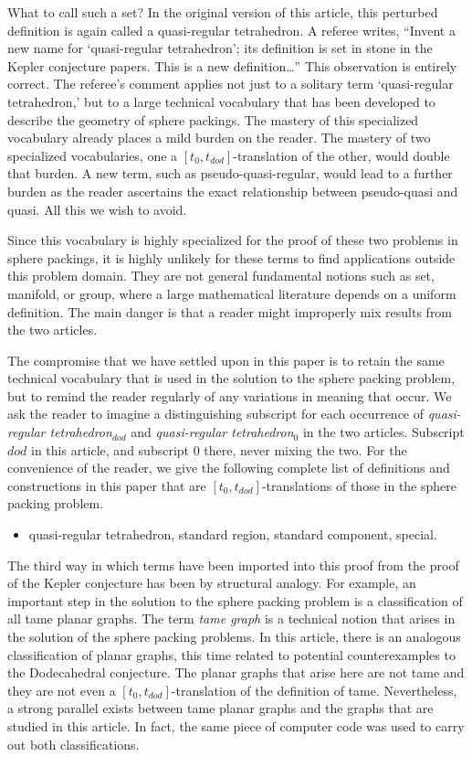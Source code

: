 What to call such a set?  In the original version of this article,
this perturbed definition is again called a quasi-regular tetrahedron. 
A referee writes, ``Invent a new name
for `quasi-regular tetrahedron'; its definition is set in stone
in the Kepler conjecture papers.  This is a new definition\ldots'' 
This observation is entirely correct.  The referee's comment applies not
just to a solitary term `quasi-regular tetrahedron,' but to
a large technical vocabulary that has been developed to describe
the geometry of sphere packings.  The mastery of this specialized
vocabulary already places a mild burden on the reader.  The mastery
of two specialized vocabularies, one a $[t_0,t_{dod}]$-translation
of the other, would double that burden.  A new term,
such as pseudo-quasi-regular, would lead to a further burden
as the reader ascertains the exact relationship between
pseudo-quasi and quasi.  All this we wish to avoid.

Since this vocabulary is highly specialized for the proof of these
two problems in sphere packings, it is highly unlikely for these terms to find applications outside this problem domain.  They are not 
general fundamental notions such as set, manifold, or group, where
a large mathematical literature depends on a uniform definition.
The main danger is that a reader might improperly mix results from the
two articles.


The compromise that we have settled upon in this paper is to
retain the same technical vocabulary that is used in the solution
to the sphere packing problem, but to remind the reader regularly
of any variations in meaning that occur.  We ask the reader to
imagine a distinguishing subscript for each occurrence of {\it quasi-regular tetrahedron$_{dod}$}
and 
{\it quasi-regular tetrahedron$_0$} in the two articles.  
Subscript $dod$ in this article, 
and subscript $0$
there, never mixing the two.
For the convenience
of the reader, we give the following complete 
list of definitions and constructions in this
paper that are $[t_0,t_{dod}]$-translations of those in the sphere
packing problem.

\begin{itemize}
\item quasi-regular tetrahedron, standard region, standard component, special.
\end{itemize}

The third way in which terms have been imported into this proof
from the proof of the Kepler conjecture has been by structural
analogy.  For example, an important step in the solution to the
sphere packing problem is a classification of all tame planar graphs.
The term {\it tame graph} is a technical notion that arises in
the solution of the sphere packing problems.  In this article,
there is an analogous classification of planar graphs, this time
related to potential counterexamples to the Dodecahedral conjecture.
The planar graphs that arise here are not tame and they are
not even a $[t_0,t_{dod}]$-translation of the definition of tame.  
Nevertheless, a strong parallel exists between tame planar graphs 
and the graphs that are studied in this article.  
In fact, the same piece of computer
code was used to carry out both classifications. 

